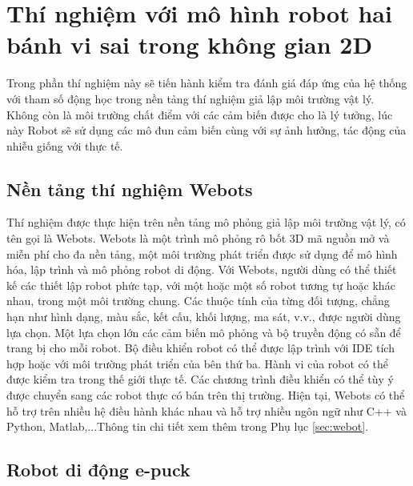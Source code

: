 \section{Thí nghiệm với mô hình robot hai bánh vi sai trong không gian 2D}

Trong phần thí nghiệm này sẽ tiến hành kiểm tra đánh giá đáp ứng của hệ thống với tham số động học trong nền tảng thí nghiệm giả lập môi trường vật lý. Không còn là môi trường chất điểm với các cảm biến được cho là lý tưởng, lúc này Robot sẽ sử dụng các mô đun cảm biến cùng với sự ảnh hưởng, tác động của nhiễu giống với thực tế.

\subsection{Nền tảng thí nghiệm Webots}

Thí nghiệm được thực hiện trên nền tảng mô phỏng giả lập môi trường vật lý, có tên gọi là Webots. Webots \cite{10.1007/3-540-68686-X_24} là một trình mô phỏng rô bốt 3D mã nguồn mở và miễn phí cho đa nền tảng, một môi trường phát triển được sử dụng để mô hình hóa, lập trình và mô phỏng robot di động. Với Webots, người dùng có thể thiết kế các thiết lập robot phức tạp, với một hoặc một số robot tương tự hoặc khác nhau, trong một môi trường chung. Các thuộc tính của từng đối tượng, chẳng hạn như hình dạng, màu sắc, kết cấu, khối lượng, ma sát, v.v., được người dùng lựa chọn. Một lựa chọn lớn các cảm biến mô phỏng và bộ truyền động có sẵn để trang bị cho mỗi robot. Bộ điều khiển robot có thể được lập trình với IDE tích hợp hoặc với môi trường phát triển của bên thứ ba. Hành vi của robot có thể được kiểm tra trong thế giới thực tế. Các chương trình điều khiển có thể tùy ý được chuyển sang các robot thực có bán trên thị trường. Hiện tại, Webots có thể hỗ trợ trên nhiều hệ điều hành khác nhau và hỗ trợ nhiều ngôn ngữ như C++ và Python, Matlab,...Thông tin chi tiết xem thêm trong Phụ lục \ref{sec:webot}.


\subsection{Robot di động e-puck}


